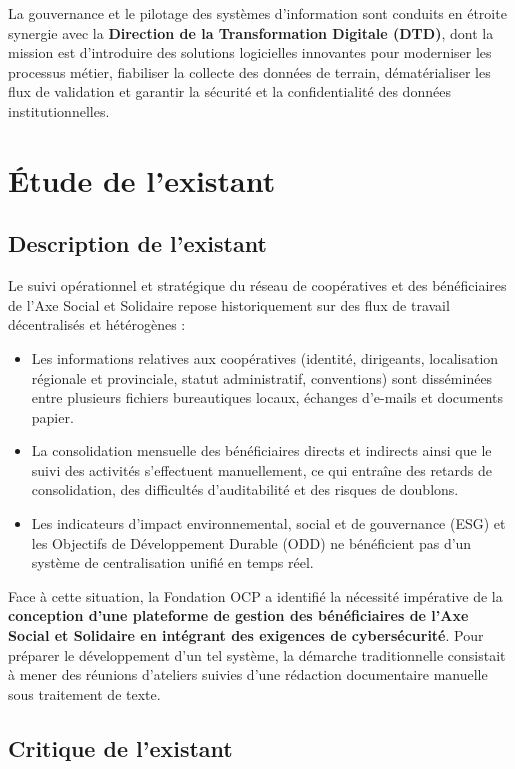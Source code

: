 La gouvernance et le pilotage des systèmes d'information sont conduits en étroite synergie avec la \textbf{Direction de la Transformation Digitale (DTD)}, dont la mission est d'introduire des solutions logicielles innovantes pour moderniser les processus métier, fiabiliser la collecte des données de terrain, dématérialiser les flux de validation et garantir la sécurité et la confidentialité des données institutionnelles.

\section{Étude de l'existant}

\subsection{Description de l'existant}

Le suivi opérationnel et stratégique du réseau de coopératives et des bénéficiaires de l'Axe Social et Solidaire repose historiquement sur des flux de travail décentralisés et hétérogènes :
\begin{itemize}
    \item Les informations relatives aux coopératives (identité, dirigeants, localisation régionale et provinciale, statut administratif, conventions) sont disséminées entre plusieurs fichiers bureautiques locaux, échanges d'e-mails et documents papier.
    \item La consolidation mensuelle des bénéficiaires directs et indirects ainsi que le suivi des activités s'effectuent manuellement, ce qui entraîne des retards de consolidation, des difficultés d'auditabilité et des risques de doublons.
    \item Les indicateurs d'impact environnemental, social et de gouvernance (ESG) et les Objectifs de Développement Durable (ODD) ne bénéficient pas d'un système de centralisation unifié en temps réel.
\end{itemize}

Face à cette situation, la Fondation OCP a identifié la nécessité impérative de la \textbf{conception d'une plateforme de gestion des bénéficiaires de l'Axe Social et Solidaire en intégrant des exigences de cybersécurité}. Pour préparer le développement d'un tel système, la démarche traditionnelle consistait à mener des réunions d'ateliers suivies d'une rédaction documentaire manuelle sous traitement de texte.

\subsection{Critique de l'existant}

